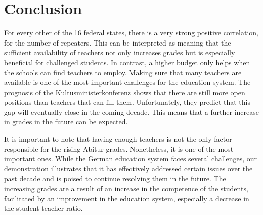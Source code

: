 \section{Conclusion}



For every other of the 16 federal states, there is a very strong positive correlation, for the number of repeaters. This can be interpreted as meaning that the sufficient availability of teachers not only increases grades but is especially beneficial for challenged students. In contrast, a higher budget only helps when the schools can find teachers to employ. Making sure that many teachers are available is one of the most important challenges for the education system. The prognosis of the Kultusministerkonferenz \cite{kultusminister_konferenz_lehrkrafteeinstellungsbedarf_2023} shows that there are still more open positions than teachers that can fill them. Unfortunately, they predict that this gap will eventually close in the coming decade. This means that a further increase in grades in the future can be expected.

It is important to note that having enough teachers is not the only factor responsible for the rising Abitur grades. Nonetheless, it is one of the most important ones. While the German education system faces several challenges, our demonstration illustrates that it has effectively addressed certain issues over the past decade and is poised to continue resolving them in the future. The increasing grades are a result of an increase in the competence of the students, facilitated by an improvement in the education system, especially a decrease in the student-teacher ratio.


